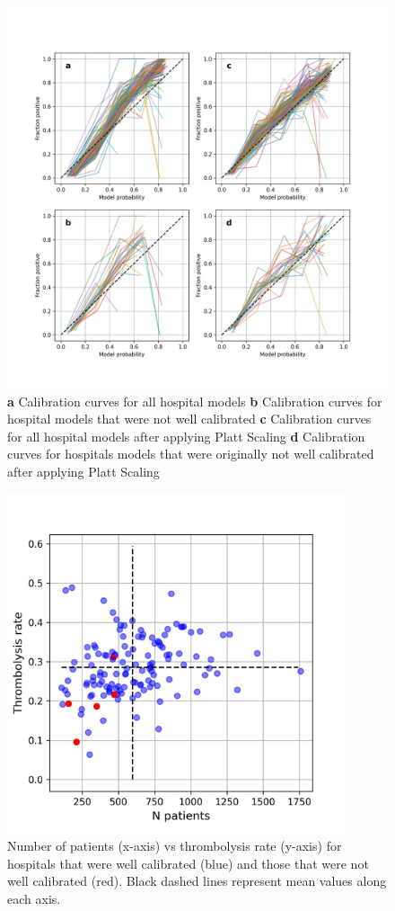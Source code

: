 \documentclass[12pt,a4paper, pdftex]{elsarticle}
\begin{document}
\begin{figure}[h]
\centering
\includegraphics[width=16cm]{figures/calibration_curves_sigmoid.jpg}
\caption{{\bf a} Calibration curves for all hospital models {\bf b} Calibration curves for hospital models that were not well calibrated {\bf c} Calibration curves for all hospital models after applying Platt Scaling {\bf d} Calibration curves for hospitals models that were originally not well calibrated after applying Platt Scaling}
\label{fig:calibration}
\end{figure}

\begin{figure}[h]
\centering
\includegraphics[width=10cm]{figures/uncalibrated.jpg}
\caption{Number of patients (x-axis) vs thrombolysis rate (y-axis) for hospitals that were well calibrated (blue) and those that were not well calibrated (red). Black dashed lines represent mean values along each axis.}
\label{fig:uncalibrated}
\end{figure}
\end{document}

